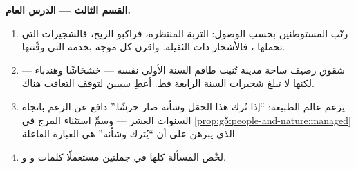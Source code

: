 \begin{problem}
\medskip\noindent\textbf{القسم الثالث --- الدرس العام.}
\begin{enumerate}[resume]
  \item رتّب المستوطنين بحسب الوصول:  التربة المنتظرة،
        فراكبو الريح، فالشجيرات التي تحملها ، فالأشجار
        ذات  الثقيلة. واقرن كل موجة بخدمة  التي
        وقّتتها.
  \item شقوق رصيف ساحة مدينة تُنبت طاقم السنة الأولى نفسه ---
        خشخاشًا وهندباء --- لكنها لا تبلغ شجيرات السنة الرابعة
        قط. أعطِ سببين لتوقف التعاقب هناك.
  \item يزعم عالم الطبيعة: ``إذا تُرك هذا الحقل وشأنه صار حرشًا.''
        دافع عن الزعم باتجاه السنوات العشر --- وسمِّ استثناء
        المرج في \cref{prop:g5:people-and-nature:managed} الذي
        يبرهن على أن ``يُترك وشأنه'' هي العبارة الفاعلة.
  \item لخّص المسألة كلها في جملتين مستعملًا كلمات
        \emph{} و\emph{} و\emph{}.
\end{enumerate}
\end{problem}
